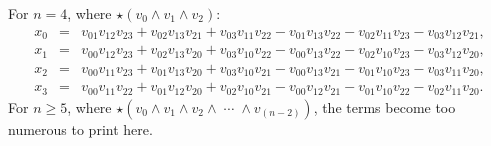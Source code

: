 \documentclass[12pt]{article}
\begin{document}
For $n = 4$, where $\star(v_{0} \wedge v_{1} \wedge v_{2})$:
\begin{eqnarray}
x_{0} &=& 
   v_{01} v_{12} v_{23}
 + v_{02} v_{13} v_{21}
 + v_{03} v_{11} v_{22}
 - v_{01} v_{13} v_{22}
 - v_{02} v_{11} v_{23}
 - v_{03} v_{12} v_{21},\\
x_{1} &=& 
    v_{00} v_{12} v_{23}
 + v_{02} v_{13} v_{20}
  + v_{03} v_{10} v_{22}
  - v_{00} v_{13} v_{22}
 - v_{02} v_{10} v_{23}
  - v_{03} v_{12} v_{20},\\
x_{2} &=& 
v_{00} v_{11} v_{23}
  + v_{01} v_{13} v_{20}
  + v_{03} v_{10} v_{21}
- v_{00} v_{13} v_{21}
  - v_{01} v_{10} v_{23}
  - v_{03} v_{11} v_{20},\\
x_{3} &=& 
   v_{00} v_{11} v_{22}
 + v_{01} v_{12} v_{20}
 + v_{02} v_{10} v_{21}
 - v_{00} v_{12} v_{21}
 - v_{01} v_{10} v_{22}
 - v_{02} v_{11} v_{20}.
\end{eqnarray}
For $n \ge 5$, where $\star(v_{0} \wedge v_{1} \wedge v_{2} \wedge\;\cdots\;\wedge v_{(n - 2)})$, the terms become too numerous to print here.


















\end{document}
